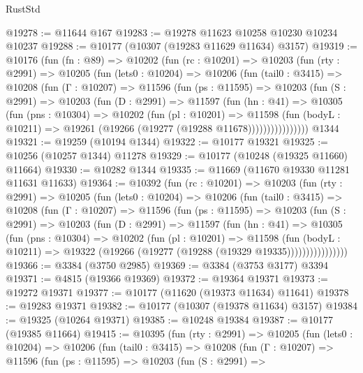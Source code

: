 \begin{lexlean}{RustStd}
\begin{coremodule}
@19278 := @11644 @167
@19283 := @19278 @11623 @10258 @10230 @10234 @10237
@19288 := @10177 (@10307 (@19283 @11629 @11634) @3157)
@19319 := @10176
    (fun (fn : @89) =>
    @10202
      (fun (rc : @10201) =>
      @10203
        (fun (rty : @2991) =>
        @10205
          (fun (lets0 : @10204) =>
          @10206
            (fun (tail0 : @3415) =>
            @10208
              (fun (Γ : @10207) =>
              @11596
                (fun (ps : @11595) =>
                @10203
                  (fun (S : @2991) =>
                  @10203
                    (fun (D : @2991) =>
                    @11597
                      (fun (hn : @41) =>
                      @10305
                        (fun (pns : @10304) =>
                        @10202
                          (fun (pl : @10201) =>
                          @11598
                            (fun (bodyL : @10211) =>
                            @19261 (@19266 (@19277 (@19288 @11678))))))))))))))))
    @1344
@19321 := @19259 (@10194 @1344)
@19322 := @10177 @19321
@19325 := @10256 (@10257 @1344) @11278
@19329 := @10177 (@10248 (@19325 @11660) @11664)
@19330 := @10282 @1344
@19335 := @11669 (@11670 @19330 @11281 @11631 @11633)
@19364 := @10392
    (fun (rc : @10201) =>
    @10203
      (fun (rty : @2991) =>
      @10205
        (fun (lets0 : @10204) =>
        @10206
          (fun (tail0 : @3415) =>
          @10208
            (fun (Γ : @10207) =>
            @11596
              (fun (ps : @11595) =>
              @10203
                (fun (S : @2991) =>
                @10203
                  (fun (D : @2991) =>
                  @11597
                    (fun (hn : @41) =>
                    @10305
                      (fun (pns : @10304) =>
                      @10202
                        (fun (pl : @10201) =>
                        @11598
                          (fun (bodyL : @10211) =>
                          @19322 (@19266 (@19277 (@19288 (@19329 @19335))))))))))))))))
@19366 := @3384 (@3750 @2985)
@19369 := @3384 (@3753 @3177) @3394
@19371 := @4815 (@19366 @19369)
@19372 := @19364 @19371
@19373 := @19272 @19371
@19377 := @10177 (@11620 (@19373 @11634) @11641)
@19378 := @19283 @19371
@19382 := @10177 (@10307 (@19378 @11634) @3157)
@19384 := @19325 (@10264 @19371)
@19385 := @10248 @19384
@19387 := @10177 (@19385 @11664)
@19415 := @10395
    (fun (rty : @2991) =>
    @10205
      (fun (lets0 : @10204) =>
      @10206
        (fun (tail0 : @3415) =>
        @10208
          (fun (Γ : @10207) =>
          @11596
            (fun (ps : @11595) =>
            @10203
              (fun (S : @2991) =>

\end{coremodule}
\end{lexlean}
